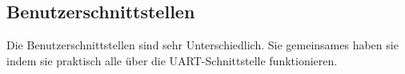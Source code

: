 \newpage
\subsection{Benutzerschnittstellen}
\label{sec:Inbetriebnahme_Benutzerschnittstellen}

Die Benutzerschnittstellen sind sehr Unterschiedlich. Sie gemeinsames haben sie indem sie praktisch alle über die UART-Schnittstelle funktionieren.